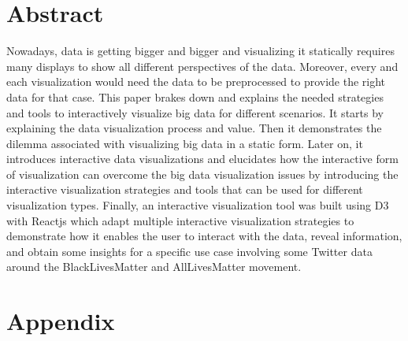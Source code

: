 \documentclass[svgnames]{article}
\begin{document}
\tableofcontents
\newpage

\section{Abstract}

Nowadays, data is getting bigger and bigger and visualizing it statically requires many displays to show all different perspectives of the data. Moreover, every and each visualization would need the data to be preprocessed to provide the right data for that case. This paper brakes down and explains the needed strategies and tools to interactively visualize big data for different scenarios. It starts by explaining the data visualization process and value. Then it demonstrates the dilemma associated with visualizing big data in a static form. Later on, it introduces interactive data visualizations and elucidates how the interactive form of visualization can overcome the big data visualization issues by introducing the interactive visualization strategies and tools that can be used for different visualization types. Finally, an interactive visualization tool \cite{d3tool} was built using D3 with Reactjs which adapt multiple interactive visualization strategies to demonstrate how it enables the user to interact with the data, reveal information, and obtain some insights for a specific use case involving some Twitter data around the BlackLivesMatter and AllLivesMatter movement.



\newpage

\newpage

\newpage

\newpage

\newpage

\newpage

\newpage







\newpage
\section{Appendix}



\end{document}
